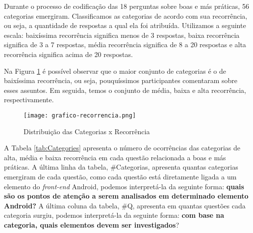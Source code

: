 Durante o processo de codifica\c{c}\~ao das 18 perguntas sobre boas e m\'as pr\'aticas, 56 categorias emergiram. Classificamos as categorias de acordo com sua recorr\^encia, ou seja, a quantidade de respostas a qual ela foi atribu\'ida. Utilizamos a seguinte escala: baix\'issima recorr\^encia significa menos de 3 respostas, baixa recorr\^encia significa de 3 a 7 respostas, m\'edia recorr\^encia significa de 8 a 20 respostas e alta recorr\^encia significa acima de 20 respostas.

Na Figura \ref{fig:CategoriaXRecorrencia} \'e poss\'ivel observar que o maior conjunto de categorias é o de baix\'issima recorr\^encia, ou seja, pouqu\'issimos participantes comentaram sobre esses assuntos. Em seguida, temos o conjunto de m\'edia, baixa e alta recorr\^encia, respectivamente.

\begin{figure}[!htb]
	\centering
	\texttt{[image: grafico-recorrencia.png]}
	\caption{Distribui\c{c}\~ao das Categorias x Recorr\^encia}
	\label{fig:CategoriaXRecorrencia}
\end{figure}


A Tabela \ref{tab:Categories} apresenta o n\'umero de ocorr\^encias das categorias de alta, m\'edia e baixa recorr\^encia em cada quest\~ao relacionada a boas e m\'as pr\'aticas. A \'ultima linha da tabela, \#Categorias, apresenta quantas categorias emergiram de cada quest\~ao, como cada quest\~ao est\'a diretamente ligada a um elemento do \textit{front-end} Android, podemos interpret\'a-la da seguinte forma: \textbf{quais s\~ao os pontos de aten\c{c}\~ao a serem analisados em determinado elemento Android?} A \'ultima coluna da tabela, \#Q, apresenta em quantas quest\~oes cada categoria surgiu, podemos interpret\'a-la da seguinte forma: \textbf{com base na categoria, quais elementos devem ser investigados}?



